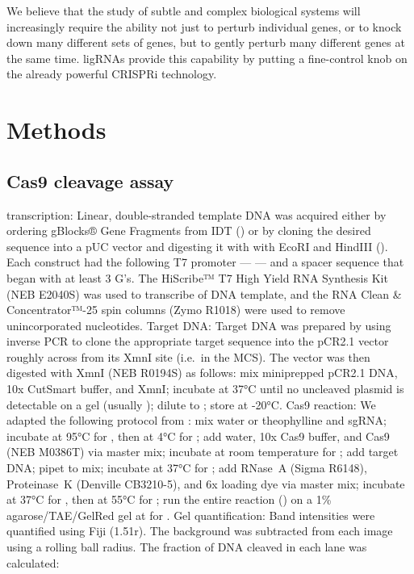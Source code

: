 \documentclass[10pt,oneside]{article}
\begin{document}

We believe that the study of subtle and complex biological systems will increasingly require the ability not just to perturb individual genes, or to knock down many different sets of genes, but to gently perturb many different genes at the same time.  ligRNAs provide this capability by putting a fine-control knob on the already powerful CRISPRi technology.

\section{Methods}

\subsection{\Invitro{} Cas9 cleavage assay}

\Invitro{} transcription: Linear, double-stranded template DNA was acquired either by ordering gBlocks® Gene Fragments from IDT () or by cloning the desired sequence into a pUC vector and digesting it with with EcoRI and HindIII ().  Each construct had the following T7 promoter ---  --- and a spacer sequence that began with at least 3 G's.  The HiScribe™ T7 High Yield RNA Synthesis Kit (NEB E2040S) was used to transcribe  of DNA template, and the RNA Clean \& Concentrator™-25 spin columns (Zymo R1018) were used to remove unincorporated nucleotides.  Target DNA: Target DNA was prepared by using inverse PCR to clone the appropriate target sequence into the pCR2.1 vector roughly across from its XmnI site (i.e.\ in the MCS).  The vector was then digested with XmnI (NEB R0194S) as follows: mix   miniprepped pCR2.1 DNA,  10x CutSmart buffer, and   XmnI; incubate at 37°C until no uncleaved plasmid is detectable on a gel (usually ); dilute to ; store at -20°C.  Cas9 reaction: We adapted the following protocol from : mix  water or  theophylline and   sgRNA; incubate at 95°C for , then at 4°C for ; add  water,  10x Cas9 buffer, and   Cas9 (NEB M0386T) via master mix; incubate at room temperature for ; add   target DNA; pipet to mix; incubate at 37°C for ; add   RNase~A (Sigma R6148),   Proteinase~K (Denville CB3210-5), and  6x loading dye via master mix; incubate at 37°C for , then at 55°C for ; run the entire reaction () on a 1\% agarose/TAE/GelRed gel at  for .  Gel quantification: Band intensities were quantified using Fiji (1.51r).  The background was subtracted from each image using a  rolling ball radius.  The fraction of DNA cleaved in each lane was calculated:
\end{document}
